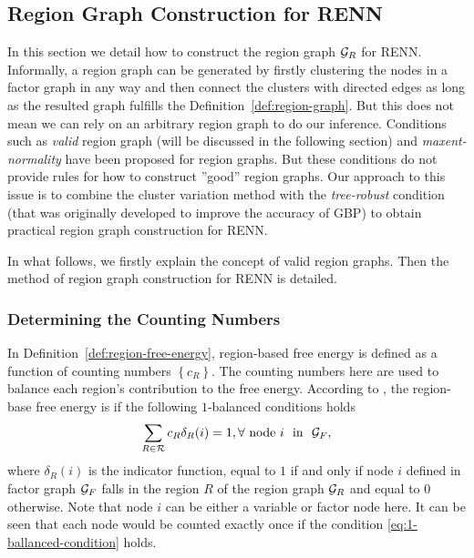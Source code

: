 \subsection{Region Graph Construction for RENN}
In this section we detail how to construct the region graph $\mathcal{G}_R$ for RENN.
Informally, a region graph can be generated by firstly clustering the nodes in a factor graph in any way and then connect the clusters with directed edges as long as the resulted graph fulfills the Definition~\ref{def:region-graph}. But this does not mean we can rely on an arbitrary region graph to do our inference. Conditions such as \textit{valid} region graph (will be discussed in the following section) and \textit{maxent-normality} \cite{yedida2005constucting,welling2005structured} have been proposed for region graphs. But these conditions do not provide rules for how to construct ''good'' region graphs.
Our approach to this issue is to combine the cluster variation method \cite{PhysRev.81.988,morita1991cluster} with the \textit{tree-robust} condition \cite{gelfand2012generalized} (that was originally developed to improve the accuracy of GBP) to obtain practical region graph construction for RENN.

In what follows, we firstly explain the concept of valid region graphs. Then the method of region graph construction for RENN is detailed.

\subsubsection{Determining the Counting Numbers}
\label{subsec:count-number}
In Definition~\ref{def:region-free-energy}, region-based free energy is defined as a function of counting numbers $\left\{ c_R \right\}$. The counting numbers here are used to balance each region's contribution to the free energy. According to \cite{yedida2005constucting}, the region-base free energy is  if the following $1$-balanced conditions holds
\begin{equation}\label{eq:1-ballanced-condition}
  \sum_{R\in\mathcal{R}} c_R \delta_{R}(i)  = 1, \forall~ \mathrm{node}~ i~~ \mathrm{in} ~~\mathcal{G}_F,
\end{equation}
where $\delta_{R}(i)$ is the indicator function, equal to $1$ if and only if node $i$ defined in factor graph $\mathcal{G}_F$ falls in the region $R$ of the region graph $\mathcal{G}_R$ and equal to $0$ otherwise. Note that node $i$ can be either a variable or factor node here. It can be seen that each node would be counted exactly once if the condition \eqref{eq:1-ballanced-condition} holds.

